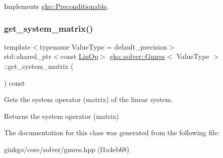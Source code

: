 Implements \hyperlink{classgko_1_1Preconditionable_ad9545089aef0dfc83bc7a74e5bf1d748}{gko\+::\+Preconditionable}.

\mbox{\label{classgko_1_1solver_1_1Gmres_a31d5c0225dbed72e52ea252dd38868f2}} 
\subsubsection{\texorpdfstring{get\+\_\+system\+\_\+matrix()}{get\_system\_matrix()}}
{\footnotesize\ttfamily template$<$typename Value\+Type  = default\+\_\+precision$>$ \\
std\+::shared\+\_\+ptr$<$const \hyperlink{classgko_1_1LinOp}{Lin\+Op}$>$ \hyperlink{classgko_1_1solver_1_1Gmres}{gko\+::solver\+::\+Gmres}$<$ Value\+Type $>$\+::get\+\_\+system\+\_\+matrix (\begin{DoxyParamCaption}{ }\end{DoxyParamCaption}) const\hspace{0.3cm}{\ttfamily [inline]}}



Gets the system operator (matrix) of the linear system. 

\begin{DoxyReturn}{Returns}
the system operator (matrix) 
\end{DoxyReturn}


The documentation for this class was generated from the following file\+:\begin{DoxyCompactItemize}
\item 
ginkgo/core/solver/gmres.\+hpp (f1a4eb68)\end{DoxyCompactItemize}
